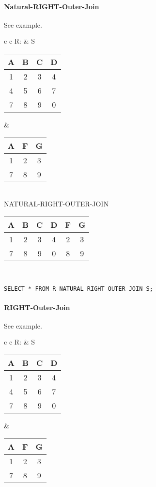 \paragraph{Natural-RIGHT-Outer-Join} See example.\\
\begin{tabular}{ c c}
	R: & S\\
	\begin{tabular}{|c|c|c|c|}
		\hline
		A & B & C & D\\
		\hline
		1 & 2 & 3 & 4\\
		\hline
		4 & 5 & 6 & 7\\
		\hline
		7 & 8 & 9 & 0\\
		\hline
	\end{tabular} &

	\begin{tabular}{|c|c|c|}
		\hline
		A & F & G \\
		\hline
		1 & 2 & 3\\
		\hline
		7 & 8 & 9\\
		\hline
	\end{tabular}
\end{tabular}\\

NATURAL-RIGHT-OUTER-JOIN\\
\begin{tabular}{|c|c|c|c|c|c|}
	\hline
	A & B & C & D & F & G\\
	\hline
	1 & 2 & 3 & 4 & 2 & 3\\
	\hline
	7 & 8 & 9 & 0 & 8 & 9\\
	\hline
\end{tabular}\\

\lstset{language=SQL,tabsize=4,captionpos=b,frame=single,
basicstyle=\footnotesize}
\begin{lstlisting}[caption=Natural-Right-Outer-Join]
SELECT * FROM R NATURAL RIGHT OUTER JOIN S;
\end{lstlisting}

\paragraph{RIGHT-Outer-Join} See example.\\
\begin{tabular}{ c c}
	R: & S\\
	\begin{tabular}{|c|c|c|c|}
		\hline
		A & B & C & D\\
		\hline
		1 & 2 & 3 & 4\\
		\hline
		4 & 5 & 6 & 7\\
		\hline
		7 & 8 & 9 & 0\\
		\hline
	\end{tabular} &

	\begin{tabular}{|c|c|c|}
		\hline
		A & F & G \\
		\hline
		1 & 2 & 3\\
		\hline
		7 & 8 & 9\\
		\hline
	\end{tabular}
\end{tabular}\\

